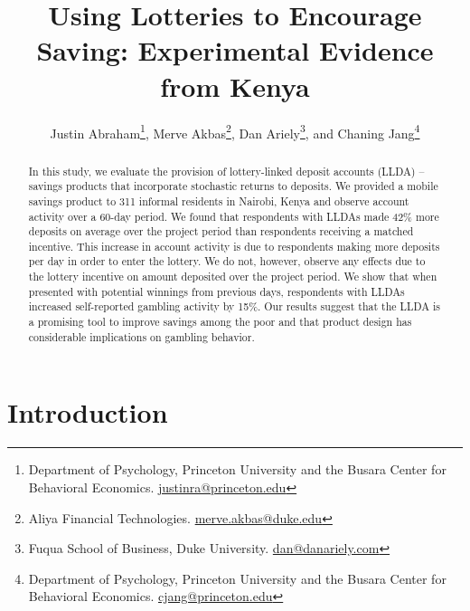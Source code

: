 \documentclass[11pt]{article}
\begin{document}
\title{Using Lotteries to Encourage Saving: Experimental Evidence from Kenya}

\author{Justin Abraham\thanks{Department of Psychology, Princeton University and the Busara Center for Behavioral Economics. \protect\href{mailto:justinra@princeton.edu}{justinra@princeton.edu}}, Merve Akbas\thanks{Aliya Financial Technologies. \protect\href{mailto:merve.akbas@duke.edu}{merve.akbas@duke.edu}}, Dan Ariely\thanks{Fuqua School of Business, Duke University. \protect\href{mailto:dan@danariely.com}{dan@danariely.com}}, and Chaning Jang\thanks{Department of Psychology, Princeton University and the Busara Center for Behavioral Economics. \protect\href{mailto:cjang@princeton.edu}{cjang@princeton.edu}}} %

\maketitle

\begin{abstract}

	In this study, we evaluate the provision of lottery-linked deposit accounts (LLDA) -- savings products that incorporate stochastic returns to deposits. We provided a mobile savings product to 311 informal residents in Nairobi, Kenya and observe account activity over a 60-day period. We found that respondents with LLDAs made 42\% more deposits on average over the project period than respondents receiving a matched incentive. This increase in account activity is due to respondents making more deposits per day in order to enter the lottery. We do not, however, observe any effects due to the lottery incentive on amount deposited over the project period. We show that when presented with potential winnings from previous days, respondents with LLDAs increased self-reported gambling activity by 15\%. Our results suggest that the LLDA is a promising tool to improve savings among the poor and that product design has considerable implications on gambling behavior.

\end{abstract}

\newpage

\section{Introduction}
\end{document}
